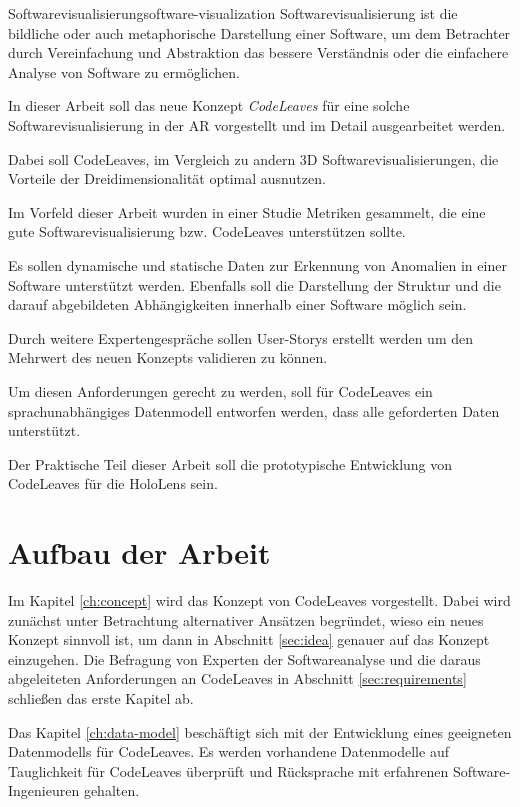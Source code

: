 \begin{defbox}{Softwarevisualisierung}{software-visualization}
Softwarevisualisierung ist die bildliche oder auch metaphorische Darstellung einer Software, um dem Betrachter durch Vereinfachung und Abstraktion das bessere Verständnis oder die einfachere Analyse von Software zu ermöglichen.
\end{defbox}

In dieser Arbeit soll das neue Konzept \emph{CodeLeaves} für eine solche Softwarevisualisierung in der AR vorgestellt und im Detail ausgearbeitet werden.

Dabei soll CodeLeaves, im Vergleich zu andern 3D Softwarevisualisierungen, die Vorteile der Dreidimensionalität optimal ausnutzen.

Im Vorfeld dieser Arbeit wurden in einer Studie Metriken gesammelt, die eine gute Softwarevisualisierung bzw. CodeLeaves unterstützen sollte.

Es sollen dynamische und statische Daten zur Erkennung von Anomalien in einer Software unterstützt werden. Ebenfalls soll die Darstellung der Struktur und die darauf abgebildeten Abhängigkeiten innerhalb einer Software möglich sein.

Durch weitere Expertengespräche sollen User-Storys erstellt werden um den Mehrwert des neuen Konzepts validieren zu können.

Um diesen Anforderungen gerecht zu werden, soll für CodeLeaves ein sprachunabhängiges Datenmodell entworfen werden, dass alle geforderten Daten unterstützt.

Der Praktische Teil dieser Arbeit soll die prototypische Entwicklung von CodeLeaves für die HoloLens sein.

\section{Aufbau der Arbeit}
Im Kapitel \ref{ch:concept} wird das Konzept von CodeLeaves vorgestellt. Dabei wird zunächst unter Betrachtung alternativer Ansätzen begründet, wieso ein neues Konzept sinnvoll ist, um dann in Abschnitt \ref{sec:idea} genauer auf das Konzept einzugehen. Die Befragung von Experten der Softwareanalyse und die daraus abgeleiteten Anforderungen an CodeLeaves in Abschnitt \ref{sec:requirements} schließen das erste Kapitel ab.

Das Kapitel \ref{ch:data-model} beschäftigt sich mit der Entwicklung eines geeigneten Datenmodells für CodeLeaves. Es werden vorhandene Datenmodelle auf Tauglichkeit für CodeLeaves überprüft und Rücksprache mit erfahrenen Software-Ingenieuren gehalten.

